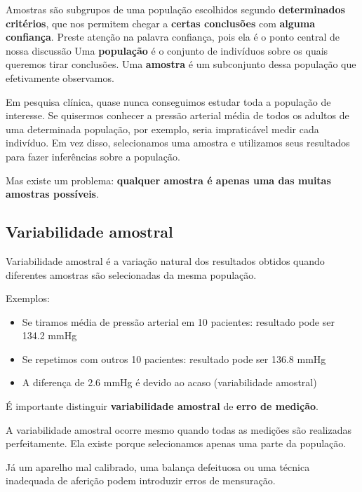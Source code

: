 Amostras são subgrupos de uma população escolhidos segundo \textbf{determinados critérios}, que nos permitem chegar a \textbf{certas conclusões} com \textbf{alguma confiança}. Preste atenção na palavra confiança, pois ela é o ponto central de nossa discussão
Uma \textbf{população} é o conjunto de indivíduos sobre os quais queremos tirar conclusões. Uma \textbf{amostra} é um subconjunto dessa população que efetivamente observamos.

Em pesquisa clínica, quase nunca conseguimos estudar toda a população de interesse. Se quisermos conhecer a pressão arterial média de todos os adultos de uma determinada população, por exemplo, seria impraticável medir cada indivíduo. Em vez disso, selecionamos uma amostra e utilizamos seus resultados para fazer inferências sobre a população.

Mas existe um problema: \textbf{qualquer amostra é apenas uma das muitas amostras possíveis}.

\subsection{Variabilidade amostral}

\begin{definition}
Variabilidade amostral é a variação natural dos resultados obtidos quando diferentes amostras são selecionadas da mesma população.
\end{definition}

Exemplos:
\begin{itemize}
    \item Se tiramos média de pressão arterial em 10 pacientes: resultado pode ser 134.2 mmHg
    \item Se repetimos com outros 10 pacientes: resultado pode ser 136.8 mmHg
    \item A diferença de 2.6 mmHg é devido ao acaso (variabilidade amostral)
\end{itemize}

\begin{error}
É importante distinguir \textbf{variabilidade amostral} de \textbf{erro de medição}.

A variabilidade amostral ocorre mesmo quando todas as medições são realizadas perfeitamente. Ela existe porque selecionamos apenas uma parte da população.

Já um aparelho mal calibrado, uma balança defeituosa ou uma técnica inadequada de aferição podem introduzir erros de mensuração.

\end{error}

